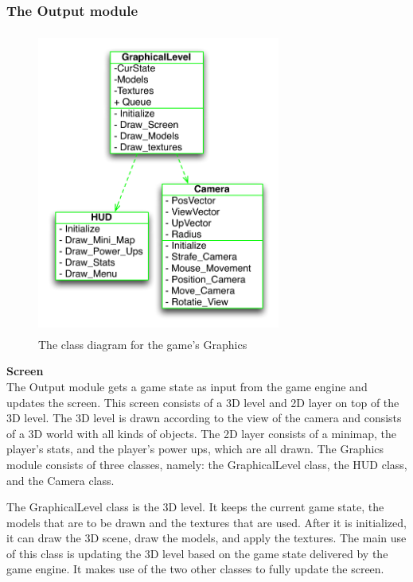   \newpage
  \subsubsection{The Output module} %
  \label{ssub:the_output_module}

  \begin{figure}[!ht]
     \centering
     \includegraphics[width=8cm,height=10cm]{diagrams/UML_output}
     \caption{The class diagram for the game's Graphics}
     \label{fig:UML_output}
   \end{figure}

   \textbf{Screen} \\
   The Output module gets a game state as input from the game engine and updates the screen. This screen consists of a 3D level and 2D layer on top of the 3D level. The 3D level is drawn according to the view of the camera and consists of a 3D world with all kinds of objects. The 2D layer consists of a minimap, the player's stats, and the player's power ups, which are all drawn. The Graphics module consists of three classes, namely: the GraphicalLevel class, the HUD class, and the Camera class.
   
   The GraphicalLevel class is the 3D level. It keeps the current game state, the models that are to be drawn and the textures that are used. After it is initialized, it can draw the 3D scene, draw the models, and apply the textures. The main use of this class is updating the 3D level based on the game state delivered by the game engine. It makes use of the two other classes to fully update the screen.
   
